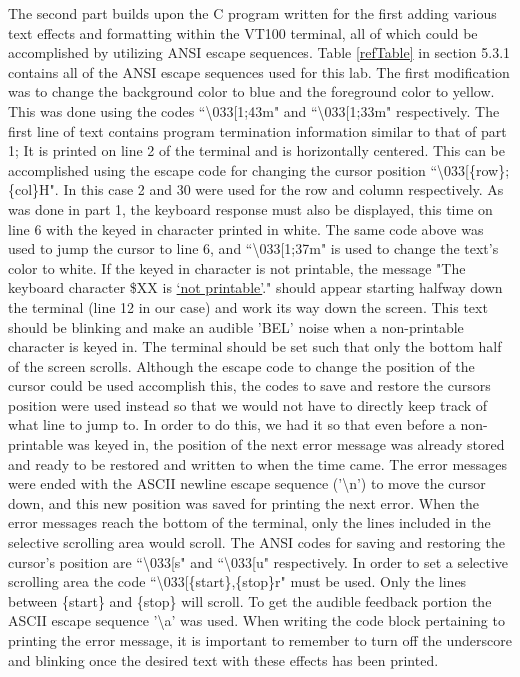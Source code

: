 \documentclass[12pt]{article}
\begin{document}
The second part builds upon the C program written for the first adding various text effects and formatting within the VT100 terminal, all of which could be accomplished by utilizing ANSI escape sequences. Table \ref{refTable} in section 5.3.1 contains all of the ANSI escape sequences used for this lab. The first modification was to change the background color to blue and the foreground color to yellow. This was done using the codes ``\textbackslash033[1;43m" and ``\textbackslash033[1;33m" respectively. The first line of text contains program termination information similar to that of part 1; It is printed on line 2 of the terminal and is horizontally centered. This can be accomplished using the escape code for changing the cursor position ``\textbackslash033[\{row\};\{col\}H". In this case 2 and 30 were used for the row and column respectively.
As was done in part 1, the keyboard response must also be displayed, this time on line 6 with the keyed in character printed in white. The same code above was used to jump the cursor to line 6, and ``\textbackslash033[1;37m" is used to change the text's color to white. If the keyed in character is not printable, the message "The keyboard character \$XX is \underline{`not printable'}." should appear starting halfway down the terminal (line 12 in our case) and work its way down the screen. This text should be blinking and make an audible 'BEL' noise when a non-printable character is keyed in. The terminal should be set such that only the bottom half of the screen scrolls. Although the escape code to change the position of the cursor could be used accomplish this, the codes to save and restore the cursors position were used instead so that we would not have to directly keep track of what line to jump to. In order to do this, we had it so that even before a non-printable was keyed in, the position of the next error message was already stored and ready to be restored and written to when the time came. The error messages were ended with the ASCII newline escape sequence ('\textbackslash n') to move the cursor down, and this new position was saved for printing the next error. When the error messages reach the bottom of the terminal, only the lines included in the selective scrolling area would scroll. The ANSI codes for saving and restoring the cursor's position are ``\textbackslash033[s" and ``\textbackslash033[u" respectively. In order to set a selective scrolling area the code ``\textbackslash033[\{start\},\{stop\}r" must be used. Only the lines between \{start\} and \{stop\} will scroll. To get the audible feedback portion the ASCII escape sequence '\textbackslash a' was used. When writing the code block pertaining to printing the error message, it is important to remember to turn off the underscore and blinking once the desired text with these effects has been printed.
\end{document}
